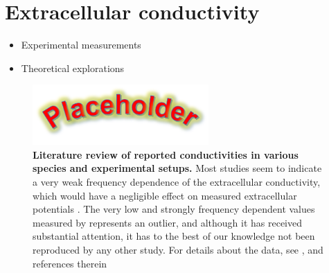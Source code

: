 \section{Extracellular conductivity}
\label{sec:conductivity}
\begin{itemize}
\item Experimental measurements \citep{Miceli2017}
\item Theoretical explorations \citep{Meffin2012,Tahayori2012,Meffin2014,Tahayori2014}
\end{itemize}

\begin{figure}[!ht]
\begin{center}
\includegraphics[width=0.6\textwidth]{Figures/Placeholder.png}
\end{center}
\caption{\textbf{Literature review of reported conductivities in various species and experimental setups.} 
Most studies seem to indicate a very weak frequency dependence of the extracellular conductivity, which would have a negligible effect on measured extracellular potentials \citep{Miceli2017}. The very low and strongly frequency dependent values measured by \cite{Gabriel1996} represents an outlier, and although it has received substantial attention, it has to the best of our knowledge not been reproduced by any other study.
For details about the data, see \citep{Miceli2017}, and references therein \citep{Ranck1963, Gabriel1996, Logothetis2007, Elbohouty2013, Wagner2014}
}
\label{fig:freq_dep}
\end{figure}



